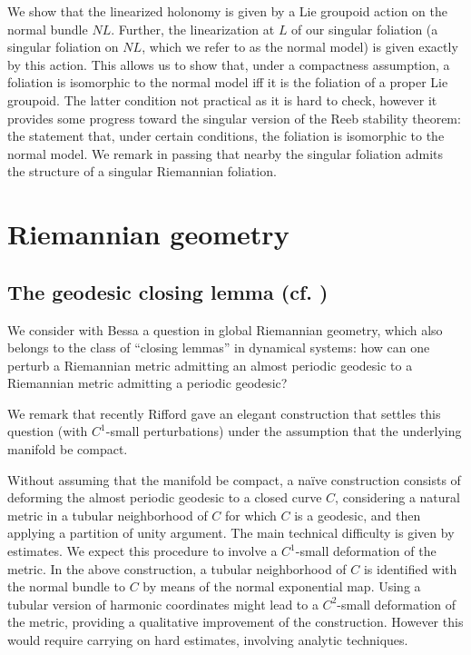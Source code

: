 \documentclass[11pt]{amsart}
\begin{document}
 We show that  the linearized holonomy is given by a Lie groupoid action on the normal bundle $NL$. Further, the linearization at $L$ of 
our singular foliation (a singular foliation on $NL$, which we refer to as the normal model)
is given exactly by this action.
This allows us to show that, under a compactness assumption, a foliation is isomorphic to the normal model if{f} it is the foliation of a proper Lie groupoid. The latter condition not practical as it is hard to check, however it provides some progress toward the singular version of the Reeb stability theorem: the statement that, under certain conditions, the foliation is isomorphic to the normal model. 
We remark in passing that  nearby the singular foliation admits the structure of a singular Riemannian foliation.



\section{Riemannian geometry} \label{riemgeo}

\subsection{The geodesic closing lemma (cf. \cite{BessaZ})}
We consider  with  Bessa \cite{BessaZ} a question in global Riemannian geometry, which also belongs to the 
class of ``closing lemmas'' in dynamical systems: how can one perturb a Riemannian metric admitting an almost periodic geodesic to a 
Riemannian metric admitting a periodic geodesic? 


We remark that recently Rifford 
\cite{Rifford} 
gave an elegant construction that settles this question (with $C^1$-small perturbations)  under the assumption that the underlying manifold  be compact. 

Without assuming that the manifold be compact, a na\"ive construction consists of deforming the almost periodic geodesic to a closed curve $C$, 
considering a natural metric in a tubular neighborhood of $C$ for which $C$ is a geodesic, and then applying 
a partition of unity argument.  The main technical difficulty is given by estimates.  We expect   this 
procedure to involve a  $C^1$-small deformation of the metric. 
In the above construction, a  tubular neighborhood of $C$ is identified with the normal bundle to $C$ by 
means of the normal exponential map. Using a tubular version of harmonic coordinates might lead to a 
$C^2$-small deformation of the metric, providing a  qualitative improvement of the construction. However 
this would require carrying on hard estimates,  involving analytic techniques. 





\end{document}
